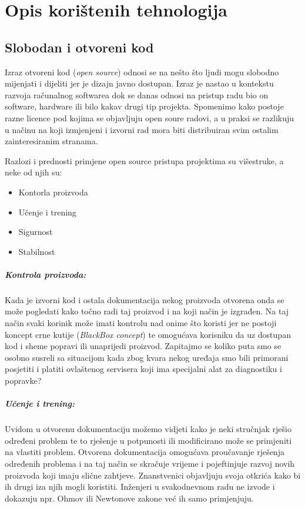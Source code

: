 \chapter{Opis korištenih tehnologija}\label{technologyStack}
\section{Slobodan i otvoreni kod}
Izraz otvoreni kod (\textit{open source}) odnosi se na nešto što ljudi mogu slobodno mijenjati i dijeliti jer je dizajn javno dostupan\cite{WhatIsOpenSource}.
Izraz je nastao u kontekstu razvoja računalnog softwarea dok se danas odnosi na pristup radu bio on software, hardware ili bilo kakav drugi tip projekta.
Spomenimo kako postoje razne licence pod kojima se objavljuju open soure radovi, a u praksi se razlikuju u načinu na koji izmjenjeni i izvorni rad mora biti distribuiran svim ostalim zainteresiranim stranama.

Razlozi i prednosti primjene open source pristupa projektima su višestruke, a neke od njih su:
\begin{itemize}
\item Kontorla proizvoda
\item Učenje i trening
\item Sigurnost
\item Stabilnost
\end{itemize}

\paragraph{Kontrola proizvoda:}
Kada je izvorni kod i ostala dokumentacija nekog proizvoda otvorena onda se može pogledati kako točno radi taj proizvod i na koji način je izgrađen.
Na taj način svaki korinik može imati kontrolu nad onime što koristi jer ne postoji koncept crne kutije (\textit{BlackBox concept}) te omogućava korisniku da uz dostupan kod i sheme popravi ili unaprijedi proizvod.
Zapitajmo se koliko puta smo se osobno susreli sa situacijom kada zbog kvara nekog uređaja smo bili primorani posjetiti i platiti ovlaštenog servisera koji ima specijalni alat za diagnostiku i popravke?

\paragraph{Učenje i trening:}
Uvidom u otvorenu dokumentaciju možemo vidjeti kako je neki stručnjak rješio određeni problem te to rješenje u potpunosti ili modificirano može se primjeniti na vlastiti problem.
Otvorena dokumentacija omogućava proučavanje rješenja određenih problema i na taj način se skračuje vrijeme i pojeftinjuje razvoj novih proizvoda koji imaju slične zahtjeve.
Znanstvenici objavljuju svoja otkrića kako bi ih drugi iza njih mogli koristiti.
Inženjeri u svakodnevnom radu ne izvode i dokazuju npr. Ohmov ili Newtonove zakone već ih samo primjenjuju.

